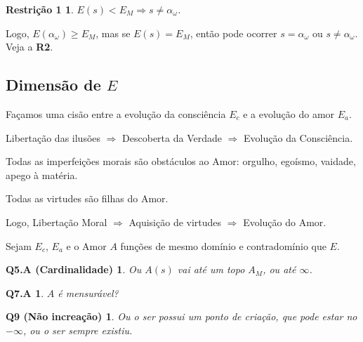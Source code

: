 \documentclass[12pt,a4paper]{article}
\begin{document}
			\newtheorem{R1}{Restri\c{c}\~ao 1}
			\begin{R1} $ E(s) < E_M \Rightarrow s \neq \alpha_\omega $.
			\end{R1}

			Logo, $ E(\alpha_\omega) \ge E_M $, mas se $ E(s) = E_M $, ent\~ao pode ocorrer $s = \alpha_\omega $ ou $ s \neq \alpha_\omega $. Veja a \textbf{R2}.

		\subsection{Dimens\~ao de $E$}\label{amor} %
			\begin{flushright}
			\end{flushright}

			Fa\c{c}amos uma cis\~ao entre a evolu\c{c}\~ao da consci\^encia $E_c$ e a evolu\c{c}\~ao do amor $E_a$.

			Liberta\c{c}\~ao das ilus\~oes $ \Rightarrow $ Descoberta da Verdade $ \Rightarrow $ Evolu\c{c}\~ao da Consci\^encia.

			Todas as imperfei\c{c}\~oes morais s\~ao obst\'aculos ao Amor: orgulho, ego\'ismo, vaidade, apego \`a mat\'eria.

			\begin{center}
			\end{center}

			Todas as virtudes s\~ao filhas do Amor.

			Logo, Liberta\c{c}\~ao Moral $ \Rightarrow $ Aquisi\c{c}\~ao de virtudes $ \Rightarrow $ Evolu\c{c}\~ao do Amor.

			Sejam $ E_c $, $ E_a $ e o Amor $A$ fun\c{c}\~oes de mesmo dom\'inio e contradom\'inio que $E$.

			\newtheorem{Q5.A}{Q5.A (Cardinalidade)}
			\begin{Q5.A} Ou $A(s)$ vai at\'e um topo $ A_M $, ou at\'e $ \infty $.
			\end{Q5.A}

			\newtheorem{Q7.A}{Q7.A}
			\begin{Q7.A} $A$ \'e mensur\'avel?
			\end{Q7.A}


			\newtheorem{Q9}{Q9 (N\~ao increa\c{c}\~ao)}
			\begin{Q9} Ou o ser possui um ponto de cria\c{c}\~ao, que pode estar no $ -\infty $, ou o ser sempre existiu.
			\end{Q9}
\end{document}

